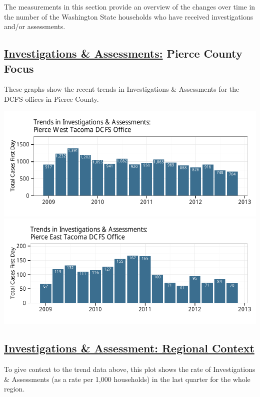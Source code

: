 \documentclass{article}\usepackage{graphicx, color}
\makeatletter
\def\maxwidth{ %
  \ifdim\Gin@nat@width>\linewidth
    \linewidth
  \else
    \Gin@nat@width
  \fi
}
\newenvironment{knitrout}{}{} %
\makeatother
\begin{document}
The measurements in this section provide an overview of the changes over time in the number of the Washington State households who have received investigations and/or assessments.

\subsection{\href{http://www.partnersforourchildren.org//child-well-being/visualizations/investigations-assessments/trends}
{Investigations \& Assessments:} Pierce County Focus}
These graphs show the recent trends in Investigations \& Assessments for the DCFS offices in
Pierce County.
\begin{knitrout}
\color{fgcolor}

{\centering \includegraphics[width=\maxwidth]{figure/ia_focus1} 
\includegraphics[width=\maxwidth]{figure/ia_focus2} 

}



\end{knitrout}


\subsection{
    \href{http://www.partnersforourchildren.org//child-well-being/visualizations/investigations-assessments/trends}
    {Investigations \& Assessment: Regional Context}
}
To give context to the trend data above, this plot shows the rate of Investigations \& Assessments (as a rate per 1,000 households) in the last quarter for the whole region.
\end{document}
